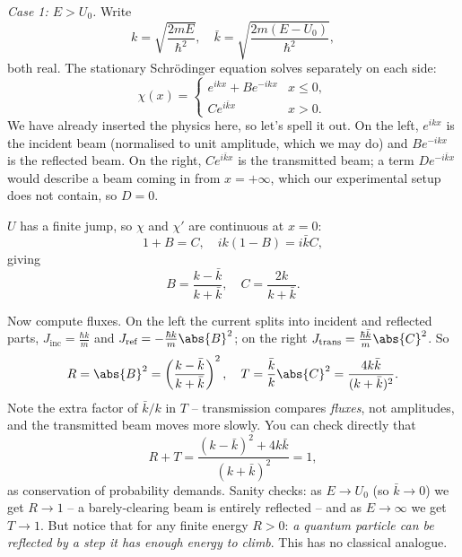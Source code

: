 \emph{Case 1: $E > U_0$.} Write
$$
k = \sqrt{\frac{2mE}{\hbar^2}}, \quad \bar{k} = \sqrt{\frac{2m(E - U_0)}{\hbar^2}},
$$
both real. The stationary Schr\"odinger equation solves separately on each side:
$$
\chi(x) = \begin{cases}
    e^{ikx} + B e^{-ikx} & x \leq 0, \\
    C e^{i \bar{k} x} & x > 0.
\end{cases}
$$
We have already inserted the physics here, so let's spell it out. On the left, $e^{ikx}$ is the incident beam (normalised to unit amplitude, which we may do) and $B e^{-ikx}$ is the reflected beam. On the right, $C e^{i\bar{k}x}$ is the transmitted beam; a term $D e^{-i\bar{k}x}$ would describe a beam coming in from $x = +\infty$, which our experimental setup does not contain, so $D = 0$.

$U$ has a finite jump, so $\chi$ and $\chi'$ are continuous at $x = 0$:
$$
1 + B = C, \quad ik(1 - B) = i \bar{k} C,
$$
giving
$$
B = \frac{k - \bar{k}}{k + \bar{k}}, \quad C = \frac{2k}{k + \bar{k}}.
$$

\begin{center}
\end{center}

Now compute fluxes. On the left the current splits into incident and reflected parts, $J_{\text{inc}} = \frac{\hbar k}{m}$ and $J_{\text{ref}} = -\frac{\hbar k}{m}\abs{B}^2$; on the right $J_{\text{trans}} = \frac{\hbar \bar{k}}{m} \abs{C}^2$. So
$$
R = \abs{B}^2 = \left( \frac{k - \bar{k}}{k + \bar{k}} \right)^2, \quad
T = \frac{\bar{k}}{k}\abs{C}^2 = \frac{4 k \bar{k}}{(k + \bar{k})^2}.
$$
Note the extra factor of $\bar{k}/k$ in $T$ -- transmission compares \emph{fluxes}, not amplitudes, and the transmitted beam moves more slowly. You can check directly that
$$
R + T = \frac{(k - \bar{k})^2 + 4 k \bar{k}}{(k + \bar{k})^2} = 1,
$$
as conservation of probability demands. Sanity checks: as $E \rightarrow U_0$ (so $\bar{k} \rightarrow 0$) we get $R \rightarrow 1$ -- a barely-clearing beam is entirely reflected -- and as $E \rightarrow \infty$ we get $T \rightarrow 1$. But notice that for any finite energy $R > 0$: \emph{a quantum particle can be reflected by a step it has enough energy to climb}. This has no classical analogue.

